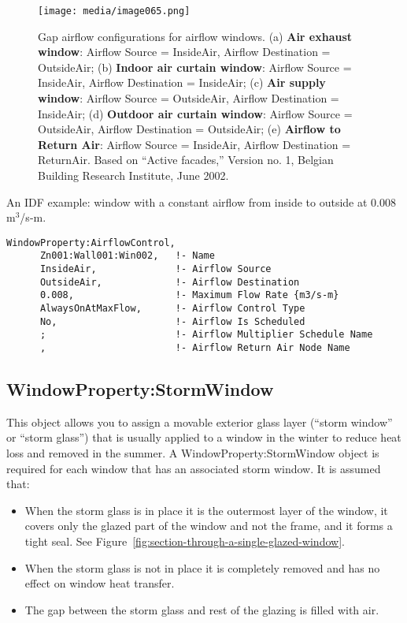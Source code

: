 \begin{figure}[hbtp] %
\centering
\texttt{[image: media/image065.png]}
  \caption{Gap airflow configurations for airflow windows. (a) \textbf{Air exhaust window}: Airflow Source = InsideAir, Airflow Destination = OutsideAir; (b) \textbf{Indoor air curtain window}: Airflow Source = InsideAir, Airflow Destination = InsideAir; (c) \textbf{Air supply window}: Airflow Source = OutsideAir, Airflow Destination = InsideAir; (d) \textbf{Outdoor air curtain window}: Airflow Source = OutsideAir, Airflow Destination = OutsideAir; (e) \textbf{Airflow to Return Air}: Airflow Source = InsideAir, Airflow Destination = ReturnAir. Based on ``Active facades,'' Version no. 1, Belgian Building Research Institute, June 2002. \protect \label{fig:gap-airflow-configurations-for-airflow}}
\end{figure}

An IDF example: window with a constant airflow from inside to outside at 0.008 m\(^{3}\)/s-m.

\begin{lstlisting}
WindowProperty:AirflowControl,
      Zn001:Wall001:Win002,   !- Name
      InsideAir,              !- Airflow Source
      OutsideAir,             !- Airflow Destination
      0.008,                  !- Maximum Flow Rate {m3/s-m}
      AlwaysOnAtMaxFlow,      !- Airflow Control Type
      No,                     !- Airflow Is Scheduled
      ;                       !- Airflow Multiplier Schedule Name
      ,                       !- Airflow Return Air Node Name
\end{lstlisting}

\subsection{WindowProperty:StormWindow}\label{windowpropertystormwindow}

This object allows you to assign a movable exterior glass layer (``storm window'' or ``storm glass'') that is usually applied to a window in the winter to reduce heat loss and removed in the summer. A WindowProperty:StormWindow object is required for each window that has an associated storm window. It is assumed that:

\begin{itemize}
\item
  When the storm glass is in place it is the outermost layer of the window, it covers only the glazed part of the window and not the frame, and it forms a tight seal. See Figure~\ref{fig:section-through-a-single-glazed-window}.
\item
  When the storm glass is not in place it is completely removed and has no effect on window heat transfer.
\item
  The gap between the storm glass and rest of the glazing is filled with air.
\end{itemize}

